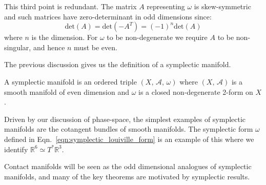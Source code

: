 This third point is redundant. The matrix $A$ representing $\omega$ is
skew-symmetric and such matrices have zero-determinant in odd dimensions
since:
\begin{equation}
    \textrm{det}(A)=\textrm{det}(-A^{T})=(-1)^{n}\textrm{det}(A)
\end{equation}
where $n$ is the dimension. For $\omega$ to be non-degenerate we require $A$
to be non-singular, and hence $n$ must be even.
\par\hfill\par
The previous discussion gives us the definition of a symplectic manifold.
\begin{definition}
    A symplectic manifold is an ordered triple $(X,\,\mathcal{A},\,\omega)$
    where $(X,\,\mathcal{A})$ is a smooth manifold of even dimension and
    $\omega$ is a closed non-degenerate 2-form on $X$.
\end{definition}
Driven by our discussion of phase-space, the simplest examples of symplectic
manifolds are the cotangent bundles of smooth manifolds. The symplectic form
$\omega$ defined in Eqn.~\ref{eqn:symplectic_louiville_form} is an example
of this where we identify $\mathbb{R}^{6}\simeq{T}^{*}\mathbb{R}^{3}$.
\par\hfill\par
Contact manifolds will be seen as the odd dimensional analogues of symplectic
manifolds, and many of the key theorems are motivated by symplectic results.
